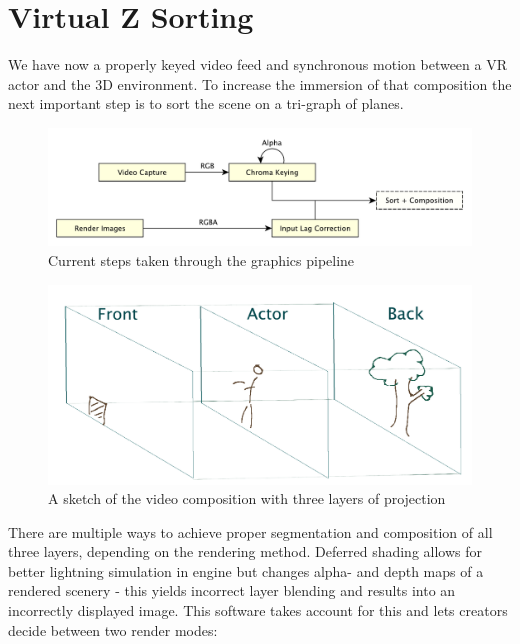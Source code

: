 %
\section{Virtual Z Sorting}

We have now a properly keyed video feed and synchronous motion between a VR 
actor and the 3D environment. To increase the immersion of that composition the 
next important step is to sort the scene on a tri-graph of planes.

\begin{figure}[htb]
	\includegraphics[width=\textwidth]{_raw_resources/pipeline_steps/4_5_composition.pdf}
	\caption{Current steps taken through the graphics pipeline}
	\label{fig:steps:composition}
\end{figure}

\begin{figure}[htb]
	\includegraphics[width=\textwidth]{_raw_resources/composition/Composition-TriGraph.png}
	\caption{A sketch of the video composition with three layers of projection}
	\label{fig:zsort:sketch}
\end{figure}

There are multiple ways to achieve proper segmentation and composition of all 
three layers, depending on the rendering method. Deferred shading allows for 
better lightning simulation in engine but changes alpha- and depth maps of a 
rendered scenery - this yields incorrect layer blending and results into an 
incorrectly displayed image. This software takes account for this and lets 
creators decide between two render modes:


